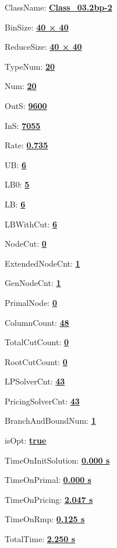 \documentclass[11pt]{article}
\begin{document}
\pagestyle{empty}


ClassName: \underline{\textbf{Class_03.2bp-2}}
\par
BinSize: \underline{\textbf{40 × 40}}
\par
ReduceSize: \underline{\textbf{40 × 40}}
\par
TypeNum: \underline{\textbf{20}}
\par
Num: \underline{\textbf{20}}
\par
OutS: \underline{\textbf{9600}}
\par
InS: \underline{\textbf{7055}}
\par
Rate: \underline{\textbf{0.735}}
\par
UB: \underline{\textbf{6}}
\par
LB0: \underline{\textbf{5}}
\par
LB: \underline{\textbf{6}}
\par
LBWithCut: \underline{\textbf{6}}
\par
NodeCut: \underline{\textbf{0}}
\par
ExtendedNodeCnt: \underline{\textbf{1}}
\par
GenNodeCnt: \underline{\textbf{1}}
\par
PrimalNode: \underline{\textbf{0}}
\par
ColumnCount: \underline{\textbf{48}}
\par
TotalCutCount: \underline{\textbf{0}}
\par
RootCutCount: \underline{\textbf{0}}
\par
LPSolverCnt: \underline{\textbf{43}}
\par
PricingSolverCnt: \underline{\textbf{43}}
\par
BranchAndBoundNum: \underline{\textbf{1}}
\par
isOpt: \underline{\textbf{true}}
\par
TimeOnInitSolution: \underline{\textbf{0.000 s}}
\par
TimeOnPrimal: \underline{\textbf{0.000 s}}
\par
TimeOnPricing: \underline{\textbf{2.047 s}}
\par
TimeOnRmp: \underline{\textbf{0.125 s}}
\par
TotalTime: \underline{\textbf{2.250 s}}
\par
\newpage


\end{document}
